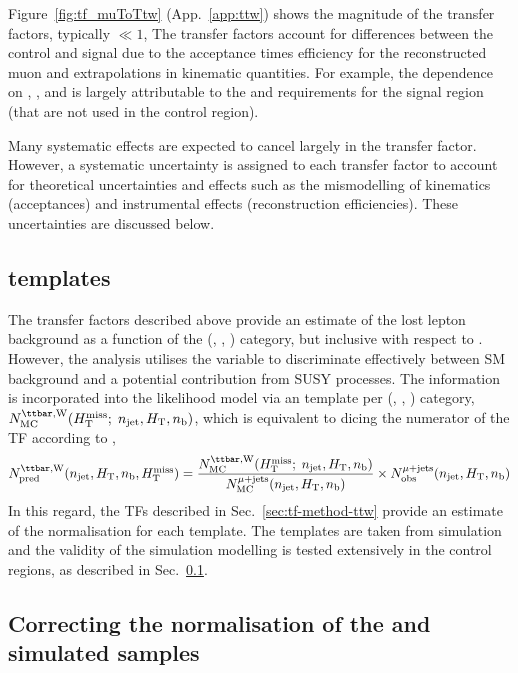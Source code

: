 Figure~\ref{fig:tf_muToTtw} (App.~\ref{app:ttw}) shows the magnitude
of the transfer factors, typically $\ll 1$, The transfer factors
account for differences between the \mj control and signal due to the
acceptance times efficiency for the reconstructed muon and
extrapolations in kinematic quantities. For example, the dependence on
\njet, \scalht, and \nb is largely attributable to the \alphat and
\bdphi requirements for the signal region (that are not used in the
\mj control region).

Many systematic effects are expected to cancel largely in the transfer
factor. However, a systematic uncertainty is assigned to each transfer
factor to account for theoretical uncertainties and effects such as
the mismodelling of kinematics (\eg acceptances) and instrumental
effects (\eg reconstruction efficiencies). These uncertainties are
discussed below. 

\subsection{\texorpdfstring{\mht}{MHT} templates}

The transfer factors described above provide an estimate of the lost
lepton background as a function of the (\njet, \scalht, \nb) category,
but inclusive with respect to \mht. However, the analysis utilises the
\mht variable to discriminate effectively between SM background and
\eg a potential contribution from SUSY processes. The \HTmiss
information is incorporated into the likelihood model via an \mht
template per (\njet, \scalht, \nb) category, $N_{\rm
  MC}^{\ttw}(\HTmiss;\; \njet, \scalht, \nb)$, which is equivalent to
dicing the numerator of the TF according to \mht, \ie
\begin{equation}
  \label{equ:pred-method}
  \npre^{\ttw}(\njet, \scalht, \nb, \HTmiss) = 
  \frac{N_{\rm MC}^{\ttw}(\HTmiss;\; \njet, \scalht, \nb)}{N_{\rm MC}^{\mj}(\njet, \scalht, \nb)} 
  \times 
  \nobs^{\mj}(\njet, \scalht, \nb)
\end{equation}
In this regard, the TFs described in Sec.~\ref{sec:tf-method-ttw}
provide an estimate of the normalisation for each \mht template. The
\HTmiss templates are taken from simulation and the validity of the
simulation modelling is tested extensively in the control regions, as
described in Sec.~\ref{}. 

\subsection{Correcting the normalisation of the \texorpdfstring{\wj}{W+jets} and \texorpdfstring{\ttbar}{TTbar} simulated samples} 
\label{sec:sideband-corrections}

